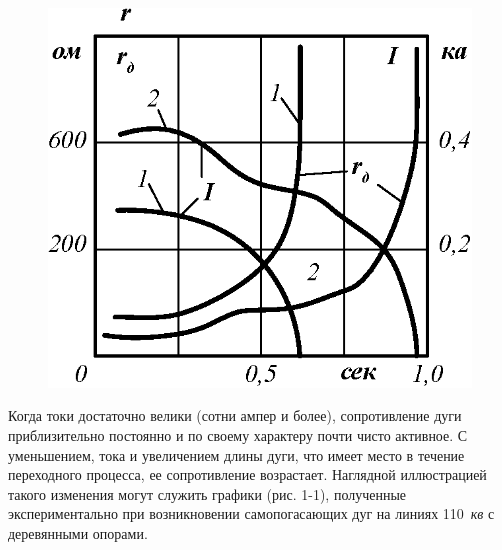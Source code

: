 \begin{figure} 
	\centering
	\caption{}
	\label{fig:q}
\end{figure}

\begin{figure}
\centering
\includegraphics[width=0.7\linewidth]{a}
\caption{}
\label{fig:a}
\end{figure}


Когда токи достаточно велики (сотни ампер и более), сопротивление дуги приблизительно постоянно и по
своему характеру почти чисто активное. С уменьшением, тока и увеличением длины дуги, что имеет место в течение переходного процесса, ее сопротивление возрастает. Наглядной иллюстрацией такого изменения могут служить графики (рис. 1-1), полученные экспериментально при возникновении самопогасающих дуг на линиях
110~\textit{кв} с деревянными опорами.






